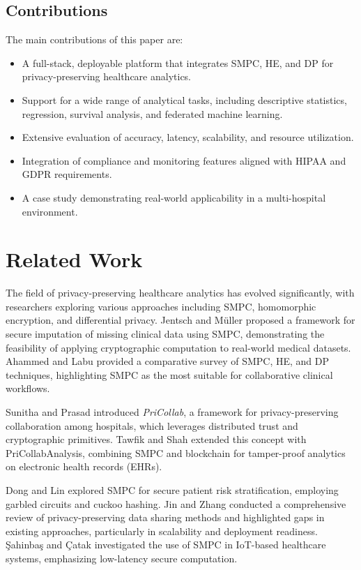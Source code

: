 \documentclass[conference]{IEEEtran}
\begin{document}
\subsection{Contributions}
The main contributions of this paper are:
\begin{itemize}
    \item A full-stack, deployable platform that integrates SMPC, HE, and DP for privacy-preserving healthcare analytics.
    \item Support for a wide range of analytical tasks, including descriptive statistics, regression, survival analysis, and federated machine learning.
    \item Extensive evaluation of accuracy, latency, scalability, and resource utilization.
    \item Integration of compliance and monitoring features aligned with HIPAA and GDPR requirements.
    \item A case study demonstrating real-world applicability in a multi-hospital environment.
\end{itemize}

\section{Related Work}
The field of privacy-preserving healthcare analytics has evolved significantly, with researchers exploring various approaches including SMPC, homomorphic encryption, and differential privacy. Jentsch and Müller \cite{jentsch2024} proposed a framework for secure imputation of missing clinical data using SMPC, demonstrating the feasibility of applying cryptographic computation to real-world medical datasets. Ahammed and Labu \cite{ahammed2024} provided a comparative survey of SMPC, HE, and DP techniques, highlighting SMPC as the most suitable for collaborative clinical workflows.

Sunitha and Prasad \cite{sunitha2024} introduced \textit{PriCollab}, a framework for privacy-preserving collaboration among hospitals, which leverages distributed trust and cryptographic primitives. Tawfik and Shah \cite{tawfik2025} extended this concept with PriCollabAnalysis, combining SMPC and blockchain for tamper-proof analytics on electronic health records (EHRs).

Dong and Lin \cite{dong2020} explored SMPC for secure patient risk stratification, employing garbled circuits and cuckoo hashing. Jin and Zhang \cite{jin2019} conducted a comprehensive review of privacy-preserving data sharing methods and highlighted gaps in existing approaches, particularly in scalability and deployment readiness. Şahinbaş and Çatak \cite{sahinbas2021} investigated the use of SMPC in IoT-based healthcare systems, emphasizing low-latency secure computation.
\end{document}
